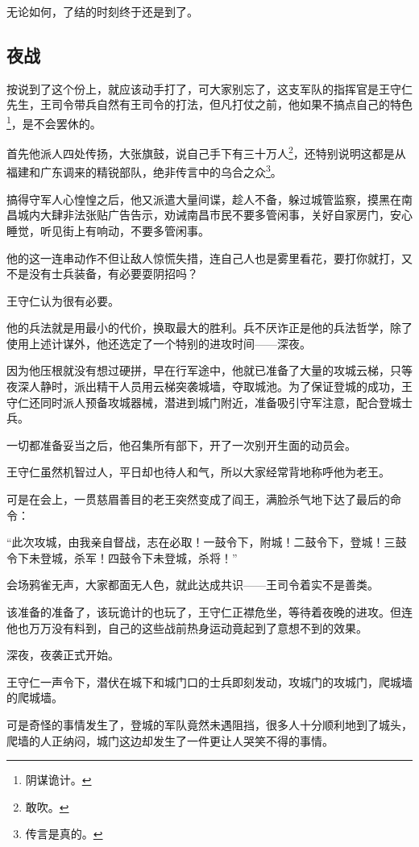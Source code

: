\begin{multicols}{\theparacolNo}
		无论如何，了结的时刻终于还是到了。

		\subsection{夜战}
		按说到了这个份上，就应该动手打了，可大家别忘了，这支军队的指挥官是王守仁先生，王司令带兵自然有王司令的打法，但凡打仗之前，他如果不搞点自己的特色\footnote{阴谋诡计。}，是不会罢休的。

		首先他派人四处传扬，大张旗鼓，说自己手下有三十万人\footnote{敢吹。}，还特别说明这都是从福建和广东调来的精锐部队，绝非传言中的乌合之众\footnote{传言是真的。}。

		搞得守军人心惶惶之后，他又派遣大量间谍，趁人不备，躲过城管监察，摸黑在南昌城内大肆非法张贴广告告示，劝诫南昌市民不要多管闲事，关好自家房门，安心睡觉，听见街上有响动，不要多管闲事。

		他的这一连串动作不但让敌人惊慌失措，连自己人也是雾里看花，要打你就打，又不是没有士兵装备，有必要耍阴招吗？

		王守仁认为很有必要。

		他的兵法就是用最小的代价，换取最大的胜利。兵不厌诈正是他的兵法哲学，除了使用上述计谋外，他还选定了一个特别的进攻时间——深夜。

		因为他压根就没有想过硬拼，早在行军途中，他就已准备了大量的攻城云梯，只等夜深人静时，派出精干人员用云梯突袭城墙，夺取城池。为了保证登城的成功，王守仁还同时派人预备攻城器械，潜进到城门附近，准备吸引守军注意，配合登城士兵。

		一切都准备妥当之后，他召集所有部下，开了一次别开生面的动员会。

		王守仁虽然机智过人，平日却也待人和气，所以大家经常背地称呼他为老王。

		可是在会上，一贯慈眉善目的老王突然变成了阎王，满脸杀气地下达了最后的命令：

		“此次攻城，由我亲自督战，志在必取！一鼓令下，附城！二鼓令下，登城！三鼓令下未登城，杀军！四鼓令下未登城，杀将！”

		会场鸦雀无声，大家都面无人色，就此达成共识——王司令着实不是善类。

		该准备的准备了，该玩诡计的也玩了，王守仁正襟危坐，等待着夜晚的进攻。但连他也万万没有料到，自己的这些战前热身运动竟起到了意想不到的效果。

		深夜，夜袭正式开始。

		王守仁一声令下，潜伏在城下和城门口的士兵即刻发动，攻城门的攻城门，爬城墙的爬城墙。

		可是奇怪的事情发生了，登城的军队竟然未遇阻挡，很多人十分顺利地到了城头，爬墙的人正纳闷，城门这边却发生了一件更让人哭笑不得的事情。


\end{multicols}
